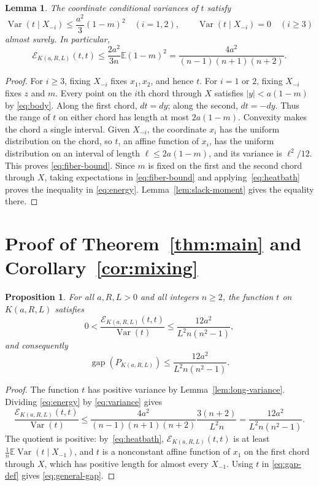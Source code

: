 \documentclass[11pt]{amsart}
\newtheorem{lemma}[theorem]{Lemma}
\newtheorem{proposition}[theorem]{Proposition}
\theoremstyle{remark}
\numberwithin{equation}{section}
\newcommand{\E}{\mathbb E}
\newcommand{\Var}{\operatorname{Var}}
\newcommand{\gap}{\operatorname{gap}}
\begin{document}
\begin{lemma}\label{lem:chords}
The coordinate conditional variances of $t$ satisfy
\begin{equation}\label{eq:fiber-bound}
 \Var(t\mid X_{-i})\le\frac{a^2}{3}(1-m)^2\quad(i=1,2),
 \qquad \Var(t\mid X_{-i})=0\quad(i\ge3)
\end{equation}
almost surely. In particular,
\begin{equation}\label{eq:energy}
 \mathcal E_{K(a,R,L)}(t,t)
 \le\frac{2a^2}{3n}\E(1-m)^2
 =\frac{4a^2}{(n-1)(n+1)(n+2)}.
\end{equation}
\end{lemma}
\begin{proof}
For $i\ge3$, fixing $X_{-i}$ fixes $x_1,x_2$, and hence $t$.
For $i=1$ or $2$, fixing $X_{-i}$ fixes $z$ and $m$.
Every point on the $i$th chord through $X$ satisfies $|y|<a(1-m)$
by \eqref{eq:body}. Along the first chord, $dt=dy$; along the second,
$dt=-dy$. Thus the range of $t$ on either chord has length at most
$2a(1-m)$. Convexity makes the chord a single interval. Given $X_{-i}$, the
coordinate $x_i$ has the uniform distribution on the chord, so $t$, an affine function of $x_i$,
has the uniform distribution on an interval of length $\ell\le2a(1-m)$, and its variance is $\ell^2/12$. This proves \eqref{eq:fiber-bound}.
Since $m$ is fixed on the first and the second chord through $X$, taking expectations in
\eqref{eq:fiber-bound} and applying~\eqref{eq:heatbath} proves
the inequality in \eqref{eq:energy}.
Lemma~\ref{lem:slack-moment} gives the equality there.
\end{proof}

\section{Proof of Theorem~\ref{thm:main} and Corollary~\ref{cor:mixing}}\label{sec:proof}
\begin{proposition}\label{prop:rayleigh}
For all $a,R,L>0$ and all integers $n\ge2$, the function $t$ on
$K(a,R,L)$ satisfies
\begin{equation}\label{eq:rayleigh-t}
 0<\frac{\mathcal E_{K(a,R,L)}(t,t)}{\Var(t)}\le\frac{12a^2}{L^2n(n^2-1)},
\end{equation}
and consequently
\begin{equation}\label{eq:general-gap}
 \gap(P_{K(a,R,L)})\le\frac{12a^2}{L^2n(n^2-1)}.
\end{equation}
\end{proposition}
\begin{proof}
The function $t$ has positive variance by Lemma~\ref{lem:long-variance}.
Dividing \eqref{eq:energy} by \eqref{eq:variance} gives
\[
 \frac{\mathcal E_{K(a,R,L)}(t,t)}{\Var(t)}
 \le\frac{4a^2}{(n-1)(n+1)(n+2)}
       \frac{3(n+2)}{L^2n}
 =\frac{12a^2}{L^2n(n^2-1)}.
\]
The quotient is positive: by~\eqref{eq:heatbath}, $\mathcal E_{K(a,R,L)}(t,t)$
is at least $\frac1n\E\Var(t\mid X_{-1})$, and $t$ is a nonconstant affine
function of $x_1$ on the first chord through $X$, which has positive
length for almost every $X_{-1}$. Using $t$ in \eqref{eq:gap-def} gives
\eqref{eq:general-gap}.
\end{proof}
\end{document}
